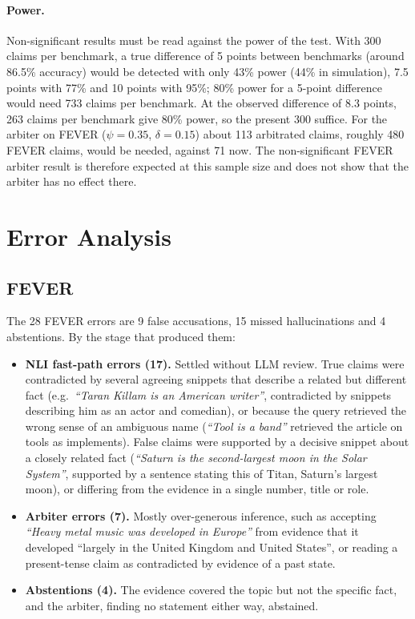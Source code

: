 \paragraph{Power.} Non-significant results must be read against the power of the test. With 300 claims per benchmark, a true difference of 5 points between benchmarks (around 86.5\% accuracy) would be detected with only 43\% power (44\% in simulation), 7.5 points with 77\% and 10 points with 95\%; 80\% power for a 5-point difference would need 733 claims per benchmark. At the observed difference of 8.3 points, 263 claims per benchmark give 80\% power, so the present 300 suffice. For the arbiter on FEVER ($\psi = 0.35$, $\delta = 0.15$) about 113 arbitrated claims, roughly 480 FEVER claims, would be needed, against 71 now. The non-significant FEVER arbiter result is therefore expected at this sample size and does not show that the arbiter has no effect there.

\section{Error Analysis}
\label{sec:errors}

\subsection{FEVER}

The 28 FEVER errors are 9 false accusations, 15 missed hallucinations and 4 abstentions. By the stage that produced them:
\begin{itemize}[itemsep=0.3em]
  \item \textbf{NLI fast-path errors (17).} Settled without LLM review. True claims were contradicted by several agreeing snippets that describe a related but different fact (e.g.\ \emph{``Taran Killam is an American writer''}, contradicted by snippets describing him as an actor and comedian), or because the query retrieved the wrong sense of an ambiguous name (\emph{``Tool is a band''} retrieved the article on tools as implements). False claims were supported by a decisive snippet about a closely related fact (\emph{``Saturn is the second-largest moon in the Solar System''}, supported by a sentence stating this of Titan, Saturn's largest moon), or differing from the evidence in a single number, title or role.
  \item \textbf{Arbiter errors (7).} Mostly over-generous inference, such as accepting \emph{``Heavy metal music was developed in Europe''} from evidence that it developed ``largely in the United Kingdom and United States'', or reading a present-tense claim as contradicted by evidence of a past state.
  \item \textbf{Abstentions (4).} The evidence covered the topic but not the specific fact, and the arbiter, finding no statement either way, abstained.
\end{itemize}

